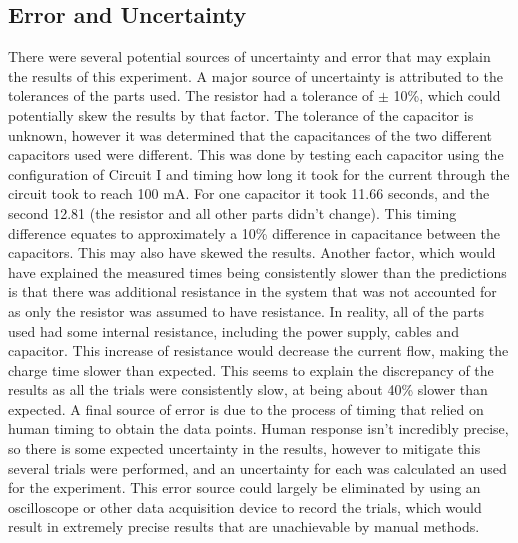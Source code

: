\documentclass[12pt,letterpaper]{article}
\begin{document}
\subsection*{Error and Uncertainty}
There were several potential sources of uncertainty and error that may explain the results of this experiment. A major source of uncertainty is attributed to the tolerances of the parts used. The resistor had a tolerance of $\pm$ 10\%, which could potentially skew the results by that factor. The tolerance of the capacitor is unknown, however it was determined that the capacitances of the two different capacitors used were different. This was done by testing each capacitor using the configuration of Circuit I and timing how long it took for the current through the circuit took to reach 100 mA. For one capacitor it took 11.66 seconds, and the second 12.81 (the resistor and all other parts didn't change). This timing difference equates to approximately a 10\% difference in capacitance between the capacitors. This may also have skewed the results. Another factor, which would have explained the measured times being consistently slower than the predictions is that there was additional resistance in the system that was not accounted for as only the resistor was assumed to have resistance. In reality, all of the parts used had some internal resistance, including the power supply, cables and capacitor. This increase of resistance would decrease the current flow, making the charge time slower than expected. This seems to explain the discrepancy of the results as all the trials were consistently slow, at being about 40\% slower than expected. A final source of error is due to the process of timing that relied on human timing to obtain the data points. Human response isn't incredibly precise, so there is some expected uncertainty in the results, however to mitigate this several trials were performed, and an uncertainty for each was calculated an used for the experiment. This error source could largely be eliminated by using an oscilloscope or other data acquisition device to record the trials, which would result in extremely precise results that are unachievable by manual methods.
\end{document}
